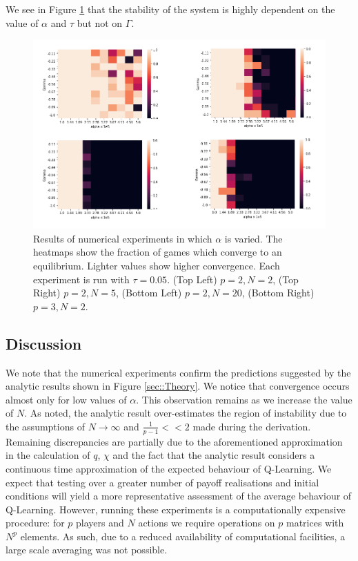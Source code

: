 \documentclass[sigconf,anonymous]{aamas}
\begin{document}
We see in Figure \ref{fig:NumericalExperiments} that the stability of the system is highly dependent on
the value of $\alpha$ and $\tau$ but not on $\Gamma$.
   
\begin{figure}[t]
    \centering
    \includegraphics[width = 1.2 \linewidth]{Figures/Experiments.png}
    \caption{Results of numerical experiments in which $\alpha$ is varied. The heatmaps show the fraction of games which converge to an equilibrium. Lighter values show higher convergence. Each experiment is run with $\tau = 0.05$. (Top Left) $p = 2, N = 2$, (Top Right) $p = 2, N = 5$, (Bottom Left) $p = 2, N = 20$, (Bottom Right) $p=3, N = 2$.}
    \label{fig:NumericalExperiments}
\end{figure}


\subsection{Discussion}

We note that the numerical experiments confirm the predictions suggested by the analytic results shown in Figure \ref{sec::Theory}. We notice that convergence occurs almost only for low values of $\alpha$. This observation remains as we increase the value of $N$. As noted, the analytic result over-estimates the region of instability due to the assumptions of $N \rightarrow \infty$ and $\frac{1}{p-1} << 2$ made during the derivation. Remaining discrepancies are partially due to the aforementioned approximation in the calculation of $q$, $\chi$ and the fact that the analytic result considers a continuous time approximation of the expected behaviour of Q-Learning. We expect that testing over a greater number of payoff realisations and initial conditions will yield a more representative assessment of the average behaviour of Q-Learning. However, running these experiments is a computationally expensive procedure: for $p$ players and $N$ actions we require operations on $p$ matrices with $N^{p}$ elements. As such, due to a reduced availability of computational facilities, a large scale averaging was not possible.
\end{document}
